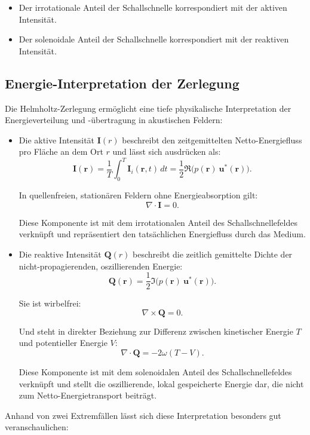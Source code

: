 \begin{itemize}
\item
Der irrotationale Anteil der Schallschnelle korrespondiert mit der
aktiven Intensität.
\item
Der solenoidale Anteil der Schallschnelle korrespondiert mit der
reaktiven Intensität.
\end{itemize}

\subsection{Energie-Interpretation der Zerlegung
\label{helmholtz:Energie_Interpretation}}
Die Helmholtz-Zerlegung ermöglicht eine tiefe physikalische
Interpretation der Energieverteilung und -übertragung in akustischen
Feldern:
\begin{itemize}
\item
Die aktive Intensität $\boldsymbol{I}(r)$ beschreibt den zeitgemittelten
Netto-Energiefluss pro Fläche an dem Ort $r$ und lässt sich ausdrücken
als:
\begin{equation}
\boldsymbol{I}(\boldsymbol{r})
=
\frac{1}{T}\int_0^T \boldsymbol{I}_i(\boldsymbol{r},t)\,dt
=
\frac{1}{2}\Re\bigl( p(\boldsymbol{r})~\boldsymbol{u}^*(\boldsymbol{r})\bigr).
\end{equation}
 
In quellenfreien, stationären Feldern ohne Energieabsorption gilt:
\begin{equation}
\nabla \cdot \boldsymbol{I}
=
0.
\end{equation}
 
Diese Komponente ist mit dem irrotationalen Anteil des Schallschnellefeldes verknüpft und repräsentiert den tatsächlichen Energiefluss durch das Medium.
 
\item Die reaktive Intensität $\boldsymbol{Q}(r)$ beschreibt die zeitlich gemittelte Dichte der nicht-propagierenden, oszillierenden Energie:
\begin{equation}
\boldsymbol{Q}(\boldsymbol{r})
=
\frac{1}{2}\Im\bigl(p(\boldsymbol{r})~\boldsymbol{u}^*(\boldsymbol{r})\bigr).
\end{equation}
 
Sie ist wirbelfrei:
\begin{equation}
\nabla \times \boldsymbol{Q}
=
0.
\end{equation}
 
Und steht in direkter Beziehung zur Differenz zwischen kinetischer Energie $T$ und potentieller Energie $V$:
\begin{equation}
\nabla \cdot \boldsymbol{Q}
=
-2 \omega (T-V).
\end{equation}
 
Diese Komponente ist mit dem solenoidalen Anteil des Schallschnellefeldes verknüpft und stellt die oszillierende, lokal gespeicherte Energie dar, die nicht zum Netto-Energietransport beiträgt.
\end{itemize}
Anhand von zwei Extremfällen lässt sich diese Interpretation besonders gut veranschaulichen:

